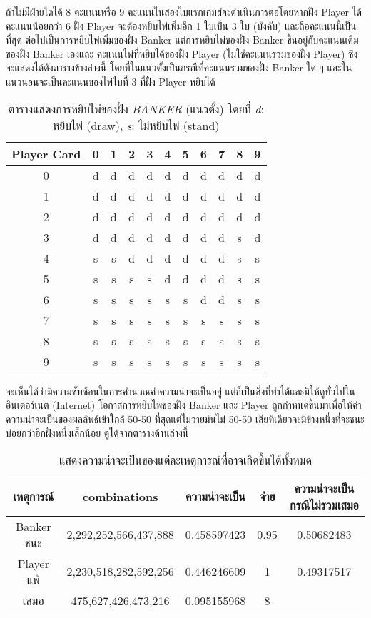 \documentclass{article}
\begin{document}
ถ้าไม่มีฝ่ายใดได้ 8 คะแนนหรือ 9 คะแนนในสองใบแรกเกมส์จะดำเนินการต่อโดยหากฝั่ง Player ได้คะแนนน้อยกว่า 6 ฝั่ง Player จะต้องหยิบไพ่เพิ่มอีก 1 ใบเป็น 3 ใบ (บังคับ) และถือคะแนนนี้เป็นที่สุด ต่อไปเป็นการหยิบไพ่เพิ่มของฝั่ง Banker แต่การหยิบไพ่ของฝั่ง Banker ขึ้นอยู่กับคะแนนเดิมของฝั่ง Banker เองและ คะแนนไพ่ที่หยิบได้ของฝั่ง Player (ไม่ใช่คะแนนรวมของฝั่ง Player) ซึ่งจะแสดงได้ดังตารางข้างล่างนี้ โดยที่ในแนวตั้งเป็นกรณีที่คะแนนรวมของฝั่ง Banker ใด ๆ และในแนวนอนจะเป็นคะแนนของไพ่ใบที่ 3 ที่ฝั่ง Player หยิบได้

\begin{table}[htb]  
\centering
\begin{tabular}{|c|c|c|c|c|c|c|c|c|c|c|}
\hline
Player Card & 0 & 1 & 2 & 3 & 4 & 5 & 6 & 7 & 8 & 9\\
\hline  
0 & d & d & d & d & d & d & d & d & d & d\\
1 & d & d & d & d & d & d & d & d & d & d\\
2 & d & d & d & d & d & d & d & d & d & d\\
3 & d & d & d & d & d & d & d & d & s & d\\
4 & s & s & d & d & d & d & d & d & s & s\\
5 & s & s & s & s & d & d & d & d & s & s\\
6 & s & s & s & s & s & s & d & d & s & s\\
7 & s & s & s & s & s & s & s & s & s & s\\
8 & s & s & s & s & s & s & s & s & s & s\\
9 & s & s & s & s & s & s & s & s & s & s\\
\hline

\end{tabular}
\caption{ตารางแสดงการหยิบไพ่ของฝั่ง \emph{BANKER} (แนวตั้ง) โดยที่  \emph{d}: หยิบไพ่ (draw), \emph{s}: ไม่หยิบไพ่ (stand)}
\end{table}

จะเห็นได้ว่ามีความซับซ้อนในการคำนวณค่าความน่าจะเป็นอยู่ แต่ก็เป็นสิ่งที่ทำได้และมีให้ดูทั่วไปในอินเตอร์เนต (Internet) โอกาสการหยิบไพ่ของฝั่ง Banker และ Player ถูกกำหนดขึ้นมาเพื่อให้ค่าความน่าจะเป็นของผลลัพธ์เข้าใกล้ 50-50 ที่สุดแต่ไม่วายมันไม่ 50-50 เสียทีเดียวจะมีข้างหนึ่งที่จะชนะบ่อยกว่าอีกฝั่งหนึ่งเล็กน้อย ดูได้จากตารางด้านล่างนี้

\begin{table}[htb]
\centering
\begin{tabular}{|c|c|c|c|c|}
\hline
เหตุการณ์ & combinations & ความน่าจะเป็น & จ่าย & ความน่าจะเป็นกรณีไม่รวมเสมอ\\
\hline
Banker ชนะ & 2,292,252,566,437,888 & 0.458597423 & 0.95 & 0.50682483\\
Player แพ้ & 2,230,518,282,592,256 & 0.446246609 & 1 & 0.49317517\\
เสมอ & 475,627,426,473,216 & 0.095155968 & 8 & \\
\hline
\end{tabular}
\caption{แสดงความน่าจะเป็นของแต่ละเหตุการณ์ที่อาจเกิดขึ้นได้ทั้งหมด}
\end{table}
\end{document}
